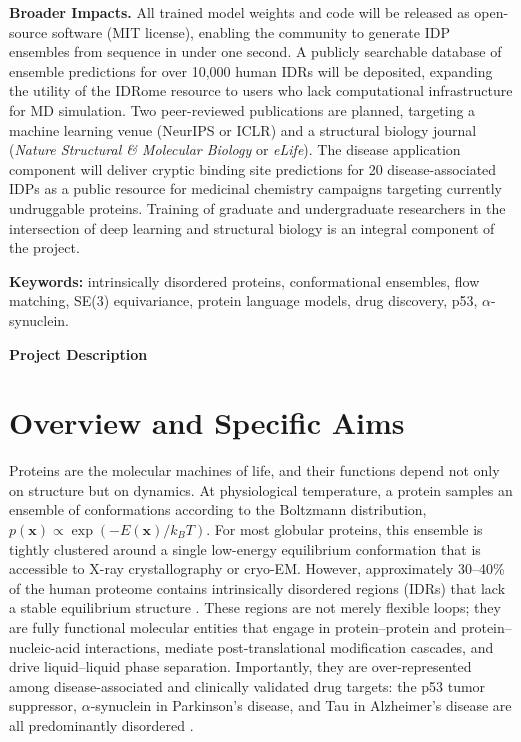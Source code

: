 \documentclass[12pt]{article}
\begin{document}
\noindent\textbf{Broader Impacts.}
All trained model weights and code will be released as open-source software (MIT license),
enabling the community to generate IDP ensembles from sequence in under one second.
A publicly searchable database of ensemble predictions for over 10,000 human IDRs will be
deposited, expanding the utility of the IDRome resource to users who lack computational
infrastructure for MD simulation.
Two peer-reviewed publications are planned, targeting a machine learning venue (NeurIPS or
ICLR) and a structural biology journal (\textit{Nature Structural \& Molecular Biology} or
\textit{eLife}).
The disease application component will deliver cryptic binding site predictions for 20
disease-associated IDPs as a public resource for medicinal chemistry campaigns targeting
currently undruggable proteins.
Training of graduate and undergraduate researchers in the intersection of deep learning and
structural biology is an integral component of the project.

\noindent\textbf{Keywords:} intrinsically disordered proteins, conformational ensembles,
flow matching, SE(3) equivariance, protein language models, drug discovery, p53, $\alpha$-synuclein.

\newpage

\begin{center}
  {\large\bfseries Project Description}
\end{center}

\section{Overview and Specific Aims}

Proteins are the molecular machines of life, and their functions depend not only on structure
but on dynamics. At physiological temperature, a protein samples an ensemble of conformations
according to the Boltzmann distribution,
$p(\mathbf{x}) \propto \exp(-E(\mathbf{x}) / k_B T)$.
For most globular proteins, this ensemble is tightly clustered around a single low-energy
equilibrium conformation that is accessible to X-ray crystallography or cryo-EM.
However, approximately 30--40\% of the human proteome contains intrinsically disordered
regions (IDRs) that lack a stable equilibrium structure
\cite{uversky2014idp_review,dyson2005idp}.
These regions are not merely flexible loops; they are fully functional molecular entities that
engage in protein--protein and protein--nucleic-acid interactions, mediate post-translational
modification cascades, and drive liquid--liquid phase separation.
Importantly, they are over-represented among disease-associated and clinically validated drug
targets: the p53 tumor suppressor, $\alpha$-synuclein in Parkinson's disease, and Tau in
Alzheimer's disease are all predominantly disordered \cite{uversky2008idp_disease}.
\end{document}
